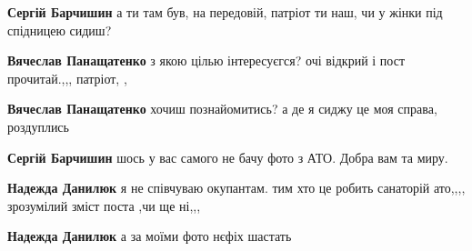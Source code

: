 \begin{itemize}
\begin{itemize}
 
\textbf{Сергій Барчишин} а ти там був, на передовій, патріот ти наш, чи у жінки під спідницею сидиш?

 
\textbf{Вячеслав Панащатенко} з якою цілью інтересуєгся? очі відкрий і пост прочитай.,,, патріот, ,

 
\textbf{Вячеслав Панащатенко} хочиш познайомитись? а де я сиджу це моя справа, роздуплись

 
\textbf{Сергій Барчишин} шось у вас самого не бачу фото з АТО. Добра вам та миру.

 
\textbf{Надежда Данилюк} я не співчуваю окупантам. тим хто це робить санаторій ато,,,, зрозумілий зміст поста ,чи ще ні,,,

 
\textbf{Надежда Данилюк} а за моїми фото нєфіх шастать
\end{itemize}


\end{itemize}
